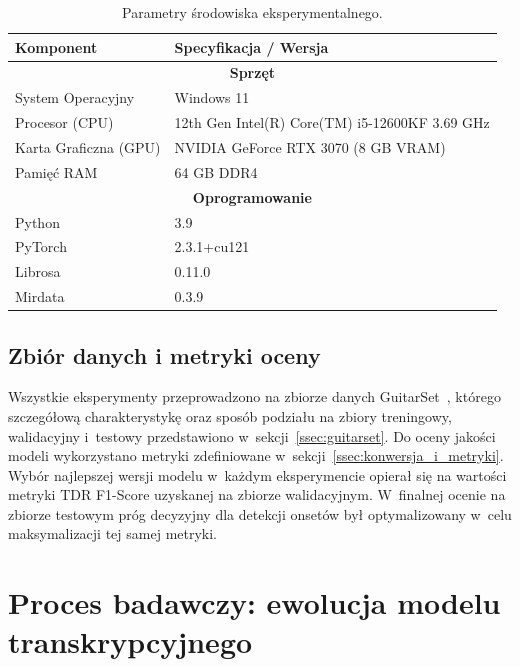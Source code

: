 \begin{table}[H]
    \centering
    \caption{Parametry środowiska eksperymentalnego.}
    \label{tab:srodowisko}
    \begin{tabularx}{\textwidth}{|l|X|}
        \hline
        \textbf{Komponent} & \textbf{Specyfikacja / Wersja} \\ \hline
        \multicolumn{2}{|c|}{\textbf{Sprzęt}} \\ \hline
        System Operacyjny & Windows 11 \\ \hline
        Procesor (CPU) & 12th Gen Intel(R) Core(TM) i5-12600KF 3.69 GHz \\ \hline
        Karta Graficzna (GPU) & NVIDIA GeForce RTX 3070 (8 GB VRAM) \\ \hline
        Pamięć RAM & 64 GB DDR4 \\ \hline
        \multicolumn{2}{|c|}{\textbf{Oprogramowanie}} \\ \hline
        Python & 3.9 \\ \hline
        PyTorch & 2.3.1+cu121~\autocite{Paszke2019PyTorch} \\ \hline
        Librosa & 0.11.0~\autocite{McFee2022Librosa} \\ \hline
        Mirdata & 0.3.9~\autocite{Bittner2022BasicPitch} \\ \hline
    \end{tabularx}
\end{table}

\subsection{Zbiór danych i metryki oceny}
\label{ssec:dane_i_metryki}

Wszystkie eksperymenty przeprowadzono na zbiorze danych GuitarSet~\autocite{Xi2018}, którego szczegółową charakterystykę oraz sposób podziału na zbiory treningowy, walidacyjny i~testowy przedstawiono w~sekcji~\ref{ssec:guitarset}. Do oceny jakości modeli wykorzystano metryki zdefiniowane w~sekcji~\ref{ssec:konwersja_i_metryki}. Wybór najlepszej wersji modelu w~każdym eksperymencie opierał się na wartości metryki TDR F1-Score uzyskanej na zbiorze walidacyjnym. W~finalnej ocenie na zbiorze testowym próg decyzyjny dla detekcji onsetów był optymalizowany w~celu maksymalizacji tej samej metryki.

\section{Proces badawczy: ewolucja modelu transkrypcyjnego}
\label{sec:ewolucja_modelu}

